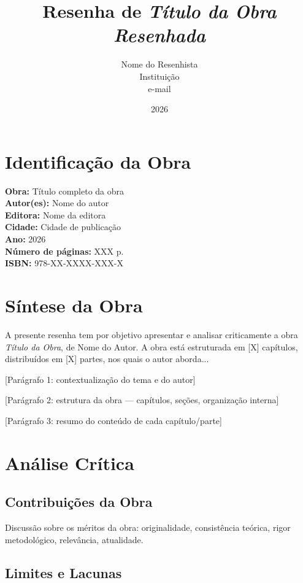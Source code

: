 \documentclass[
  12pt,
  a4paper,
  brazilian
]{article}
\title{Resenha de \textit{Título da Obra Resenhada}}
\author{Nome do Resenhista \\ \small{Instituição} \\ \small{e-mail}}
\date{2026}
\begin{document}
\maketitle

\section*{Identificação da Obra}

\begin{flushleft}
\textbf{Obra:} Título completo da obra \\
\textbf{Autor(es):} Nome do autor \\
\textbf{Editora:} Nome da editora \\
\textbf{Cidade:} Cidade de publicação \\
\textbf{Ano:} 2026 \\
\textbf{Número de páginas:} XXX p. \\
\textbf{ISBN:} 978-XX-XXXX-XXX-X
\end{flushleft}

\section*{Síntese da Obra}

A presente resenha tem por objetivo apresentar e analisar criticamente a
obra \textit{Título da Obra}, de Nome do Autor. A obra está estruturada em
[X] capítulos, distribuídos em [X] partes, nos quais o autor aborda...

[Parágrafo 1: contextualização do tema e do autor]

[Parágrafo 2: estrutura da obra — capítulos, seções, organização interna]

[Parágrafo 3: resumo do conteúdo de cada capítulo/parte]

\section*{Análise Crítica}

\subsection*{Contribuições da Obra}

Discussão sobre os méritos da obra: originalidade, consistência teórica,
rigor metodológico, relevância, atualidade.

\subsection*{Limites e Lacunas}
\end{document}

